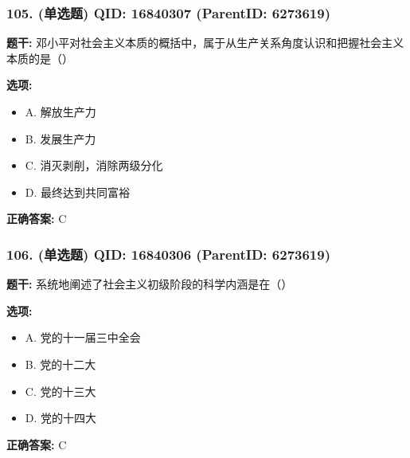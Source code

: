 \documentclass[12pt,UTF8]{ctexart}
\begin{document}
\vspace{0.3em}\hrulefill\vspace{0.7em}

\subsubsection*{105. (单选题) \small QID: 16840307 (ParentID: 6273619)}

\textbf{题干:}
邓小平对社会主义本质的概括中，属于从生产关系角度认识和把握社会主义本质的是（）



\textbf{选项:}
\begin{itemize}[leftmargin=*]

  \item A. 解放生产力

  \item B. 发展生产力

  \item C. 消灭剥削，消除两级分化

  \item D. 最终达到共同富裕

\end{itemize}

\textbf{正确答案:}
C

\vspace{0.3em}\hrulefill\vspace{0.7em}

\subsubsection*{106. (单选题) \small QID: 16840306 (ParentID: 6273619)}

\textbf{题干:}
系统地阐述了社会主义初级阶段的科学内涵是在（）



\textbf{选项:}
\begin{itemize}[leftmargin=*]

  \item A. 党的十一届三中全会

  \item B. 党的十二大

  \item C. 党的十三大

  \item D. 党的十四大

\end{itemize}

\textbf{正确答案:}
C
\end{document}
